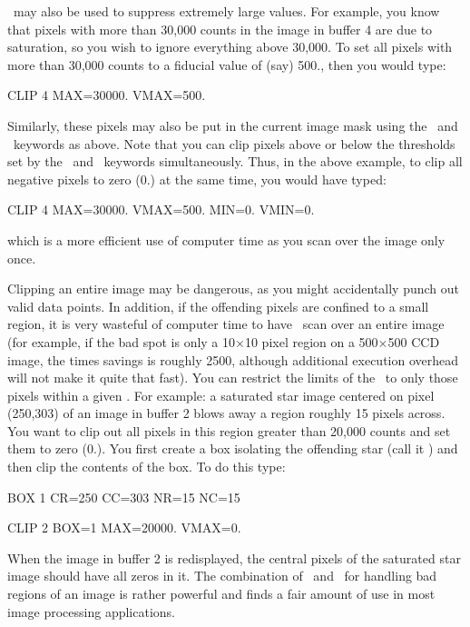\ may also be used to suppress extremely large values.  For example,
you know that pixels with more than 30,000 counts in the image in buffer 4 are
due to saturation, so you wish to ignore everything above 30,000.  To set all
pixels with more than 30,000 counts to a fiducial value of (say) 500., then
you would type: 
\begin{command}
      \item CLIP 4 MAX=30000. VMAX=500.
\end{command}
Similarly, these pixels may also be put in the current image mask using the
\ and \ keywords as above.  Note that you can clip
pixels above or below the thresholds set by the \ and \
keywords simultaneously.  Thus, in the above example, to clip all negative
pixels to zero (0.) at the same time, you would have typed: 
\begin{command}
      \item CLIP 4 MAX=30000. VMAX=500. MIN=0. VMIN=0.
\end{command}
which is a more efficient use of computer time as you scan over the image only
once. 

Clipping an entire image may be dangerous, as you might accidentally punch out
valid data points.  In addition, if the offending pixels are confined to a
small region, it is very wasteful of computer time to have \comm{CLIP}\ scan
over an entire image (for example, if the bad spot is only a 10$\times$10
pixel region on a 500$\times$500 CCD image, the times savings is roughly 2500,
although additional execution overhead will not make it quite that fast).  You
can restrict the limits of the \comm{CLIP}\ to only those pixels within a
given \comm{BOX}.  For example:  a saturated star image centered on pixel
(250,303) of an image in buffer 2 blows away a region roughly 15 pixels
across.  You want to clip out all pixels in this region greater than 20,000
counts and set them to zero (0.).  You first create a box isolating the
offending star (call it \comm{BOX 1}) and then clip the contents of the box.
To do this type: 
\begin{command}
      \item BOX 1 CR=250 CC=303 NR=15 NC=15
      \item CLIP 2 BOX=1 MAX=20000. VMAX=0.
\end{command}
When the image in buffer 2 is redisplayed, the central pixels of the saturated
star image should have all zeros in it.  The combination of \comm{CLIP}\ and
\comm{BOX}\ for handling bad regions of an image is rather powerful and finds
a fair amount of use in most image processing applications. 

